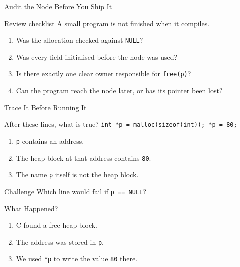 \documentclass[aspectratio=169]{beamer}
\begin{document}
\begin{frame}{Audit the Node Before You Ship It}
  \begin{block}{Review checklist}
    A small program is not finished when it compiles.
  \end{block}
  \begin{enumerate}
    \item Was the allocation checked against \texttt{NULL}?
    \item Was every field initialised before the node was used?
    \item Is there exactly one clear owner responsible for \texttt{free(p)}?
    \item Can the program reach the node later, or has its pointer been lost?
  \end{enumerate}
\end{frame}

\begin{frame}{Trace It Before Running It}
  \begin{block}{After these lines, what is true?}
    \texttt{int *p = malloc(sizeof(int)); *p = 80;}
  \end{block}
  \begin{enumerate}
    \item \texttt{p} contains an address.
    \item The heap block at that address contains \texttt{80}.
    \item The name \texttt{p} itself is not the heap block.
  \end{enumerate}
  \begin{exampleblock}{Challenge}
    Which line would fail if \texttt{p == NULL}?
  \end{exampleblock}
\end{frame}

\begin{frame}{What Happened?}
  \begin{center}
  \end{center}
  \begin{enumerate}
    \item C found a free heap block.
    \item The address was stored in \texttt{p}.
    \item We used \texttt{*p} to write the value \texttt{80} there.
  \end{enumerate}
\end{frame}
\end{document}
